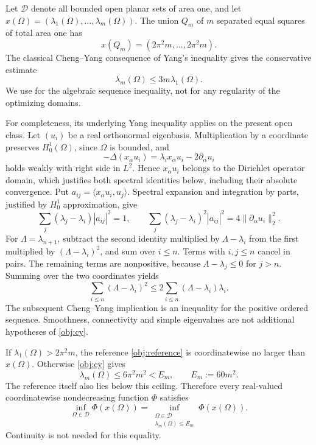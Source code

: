 \documentclass[11pt,reqno]{amsart}
\numberwithin{equation}{section}
\newcommand{\norm}[1]{\lVert#1\rVert}
\newcommand{\Om}{\Omega}
\begin{document}
Let $\mathcal D$ denote all bounded open planar sets of area one, and
let $x(\Om)=(\lambda_1(\Om),\ldots,\lambda_m(\Om))$.
The union $Q_m$ of $m$ separated equal squares of total area one has
\begin{equation}\label{obj:reference}
 x(Q_m)=(2\pi^2m,\ldots,2\pi^2m).
\end{equation}
The classical Cheng--Yang consequence of Yang's inequality gives
the conservative estimate
\begin{equation}\label{obj:cy}
 \lambda_m(\Om)\le3m\lambda_1(\Om).
\end{equation}
We use \cite{ChengYang2007,Ashbaugh2017} for the algebraic sequence
inequality, not for any regularity of the optimizing domains.

For completeness, its underlying Yang inequality applies on the
present open class. Let $(u_i)$ be a real orthonormal eigenbasis.
Multiplication by a coordinate preserves
$H^1_0(\Om)$, since $\Om$ is bounded, and
\[
 -\Delta(x_\alpha u_i)
   =\lambda_i x_\alpha u_i-2\partial_\alpha u_i
\]
holds weakly with right side in $L^2$. Hence $x_\alpha u_i$ belongs
to the Dirichlet operator domain, which justifies both spectral
identities below, including their absolute convergence. Put
$a_{ij}=\langle x_\alpha u_i,u_j\rangle$. Spectral expansion and
integration by parts, justified by $H^1_0$ approximation, give
\[
 \sum_j(\lambda_j-\lambda_i)|a_{ij}|^2=1,\qquad
 \sum_j(\lambda_j-\lambda_i)^2|a_{ij}|^2
       =4\norm{\partial_\alpha u_i}_2^2.
\]
For $\Lambda=\lambda_{n+1}$, subtract the second identity multiplied
by $\Lambda-\lambda_i$ from the first multiplied by
$(\Lambda-\lambda_i)^2$, and sum over $i\le n$. Terms with
$i,j\le n$ cancel in pairs. The remaining terms are nonpositive,
because $\Lambda-\lambda_j\le0$ for $j>n$. Summing over the two
coordinates yields
\[
 \sum_{i\le n}(\Lambda-\lambda_i)^2
       \le2\sum_{i\le n}(\Lambda-\lambda_i)\lambda_i.
\]
The subsequent Cheng--Yang implication is an inequality for the
positive ordered sequence. Smoothness, connectivity and simple
eigenvalues are not additional hypotheses of \eqref{obj:cy}.

If $\lambda_1(\Om)>2\pi^2m$, the reference \eqref{obj:reference}
is coordinatewise no larger than $x(\Om)$. Otherwise
\eqref{obj:cy} gives
\[
 \lambda_m(\Om)\le6\pi^2m^2< E_m,\qquad E_m:=60m^2.
\]
The reference itself also lies below this ceiling. Therefore every
real-valued coordinatewise nondecreasing function $\Phi$ satisfies
\begin{equation}\label{obj:ceiling}
 \inf_{\Om\in\mathcal D}\Phi(x(\Om))
 =
 \inf_{\substack{\Om\in\mathcal D\\\lambda_m(\Om)\le E_m}}
      \Phi(x(\Om)).
\end{equation}
Continuity is not needed for this equality.
\end{document}
